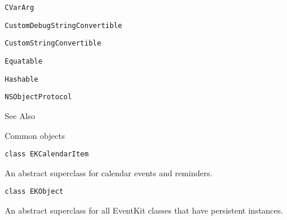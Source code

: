 \documentclass{article}
\begin{document}
\texttt{CVarArg}

\texttt{CustomDebugStringConvertible}

\texttt{CustomStringConvertible}

\texttt{Equatable}

\texttt{Hashable}

\texttt{NSObjectProtocol}

See Also

Common objects

\texttt{class EKCalendarItem}

An abstract superclass for calendar events and reminders.

\texttt{class EKObject}

An abstract superclass for all EventKit classes that have persistent instances.

\newpage
\end{document}
